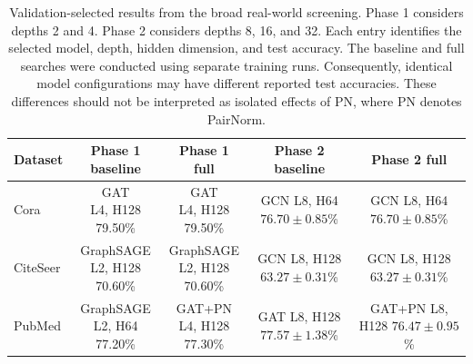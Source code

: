 \documentclass[english]{lni}
\begin{document}
\begin{landscape}
\begin{table}[p]
\centering
\caption{Validation-selected results from the broad real-world screening. Phase 1 considers depths 2 and 4. Phase 2 considers depths 8, 16, and 32. Each entry identifies the selected model, depth, hidden dimension, and test accuracy. The baseline and full searches were conducted using separate
training runs. Consequently, identical model configurations may have different reported test accuracies. These differences should not be interpreted as isolated effects of PN, where PN denotes PairNorm. }
\label{tab:broad-screening-results}
\scriptsize

\begin{tabular*}{\linewidth}{@{\extracolsep{\fill}}lcccc@{}}
\toprule
Dataset & Phase 1 baseline & Phase 1 full &
Phase 2 baseline & Phase 2 full\\
\midrule

Cora &
\makecell{GAT\\L4, H128\\79.50\%} &
\makecell{GAT\\L4, H128\\79.50\%} &
\makecell{GCN\\L8, H64\\$76.70\pm0.85$\%} &
\makecell{GCN\\L8, H64\\$76.70\pm0.85$\%}\\
\midrule

CiteSeer &
\makecell{GraphSAGE\\L2, H128\\70.60\%} &
\makecell{GraphSAGE\\L2, H128\\70.60\%} &
\makecell{GCN\\L8, H128\\$63.27\pm0.31$\%} &
\makecell{GCN\\L8, H128\\$63.27\pm0.31$\%}\\
\midrule

PubMed &
\makecell{GraphSAGE\\L2, H64\\77.20\%} &
\makecell{GAT+PN\\L4, H128\\77.30\%} &
\makecell{GAT\\L8, H128\\$77.57\pm1.38$\%} &
\makecell{GAT+PN\\L8, H128\\$76.47\pm0.95$\%}\\
\midrule


\end{tabular*}
\end{table}
\end{landscape}
\end{document}
